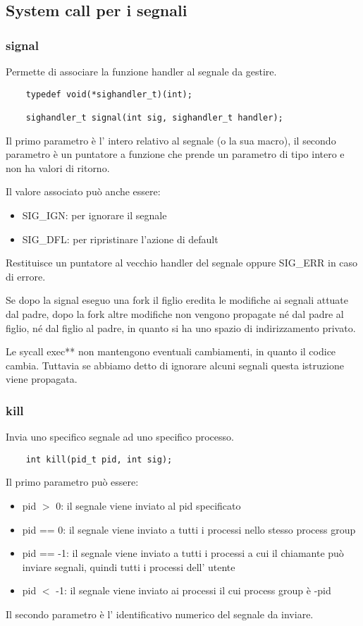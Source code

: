 \subsection{System call per i segnali}
\subsubsection{signal}
Permette di associare la funzione handler al segnale da gestire.
\begin{verbatim}
    typedef void(*sighandler_t)(int);

    sighandler_t signal(int sig, sighandler_t handler);
\end{verbatim}
Il primo parametro è l' intero relativo al segnale (o la sua macro), il secondo parametro è un puntatore a funzione che prende un parametro di tipo intero e non ha valori di ritorno.

Il valore associato può anche essere:
\begin{itemize}
    \item SIG\_IGN: per ignorare il segnale
    \item SIG\_DFL: per ripristinare l'azione di default
\end{itemize}

Restituisce un puntatore al vecchio handler del segnale oppure SIG\_ERR in caso di errore.

Se dopo la signal eseguo una fork il figlio eredita le modifiche ai segnali attuate dal padre, dopo la fork altre modifiche non vengono propagate né dal padre al figlio, né dal figlio al padre, in quanto si ha uno spazio di indirizzamento privato.

Le sycall exec** non mantengono eventuali cambiamenti, in quanto il codice cambia.
Tuttavia se abbiamo detto di ignorare alcuni segnali questa istruzione viene propagata.

\subsubsection{kill}
Invia uno specifico segnale ad uno specifico processo.
\begin{verbatim}
    int kill(pid_t pid, int sig);
\end{verbatim}
Il primo parametro può essere:
\begin{itemize}
    \item pid $>$ 0: il segnale viene inviato al pid specificato
    \item pid == 0: il segnale viene inviato a tutti i processi nello stesso process group
    \item pid == -1: il segnale viene inviato a tutti i processi a cui il chiamante può inviare segnali, quindi tutti i processi dell' utente
    \item pid $<$ -1: il segnale viene inviato ai processi il cui process group è -pid
\end{itemize}
Il secondo parametro è l' identificativo numerico del segnale da inviare.


